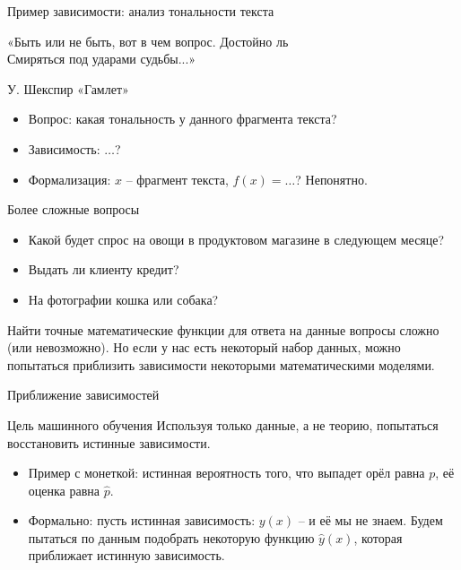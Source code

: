\documentclass[c, handout]{beamer} %
\begin{document}
	\begin{frame}{Пример зависимости: анализ тональности текста}
		\begin{center}
			«Быть или не быть, вот в чем вопрос. Достойно ль \\
			Смиряться под ударами судьбы...»
		\end{center}
		\begin{flushright}
			{\small У. Шекспир «Гамлет»}
		\end{flushright}
	\begin{itemize}
		\item<1-> Вопрос: какая тональность у данного фрагмента текста?
		\item<2-> Зависимость: $\ldots$?
		\item<2-> Формализация: $x$ – фрагмент текста, $f(x) = \ldots$? Непонятно.
		
	\end{itemize}

	\end{frame}

	
	\begin{frame}{Более сложные вопросы}
		
		\begin{itemize}
			\item Какой будет спрос на овощи в продуктовом магазине в следующем месяце?
			\item Выдать ли клиенту кредит? 
			\item На фотографии кошка или собака? 
		\end{itemize}
	
		Найти точные математические функции для ответа на данные вопросы сложно (или невозможно). Но если у нас есть некоторый набор данных, можно попытаться \alert{приблизить} зависимости некоторыми математическими моделями.
	\end{frame}
		
	\begin{frame}{Приближение зависимостей}
		\begin{block}{Цель машинного обучения}
			Используя только данные, а не теорию, попытаться восстановить истинные зависимости.
		\end{block}
		
		\begin{itemize}
			\item<1-> Пример с монеткой: истинная вероятность того, что выпадет орёл равна $p$, её оценка равна $\hat{p}$.
			\item<2-> Формально: пусть истинная зависимость: $y(x)$ – и её мы не знаем. Будем пытаться по данным подобрать некоторую функцию $\hat{y}(x)$, которая приближает истинную зависимость. 
		\end{itemize}	
	\end{frame}
			
\end{document}
